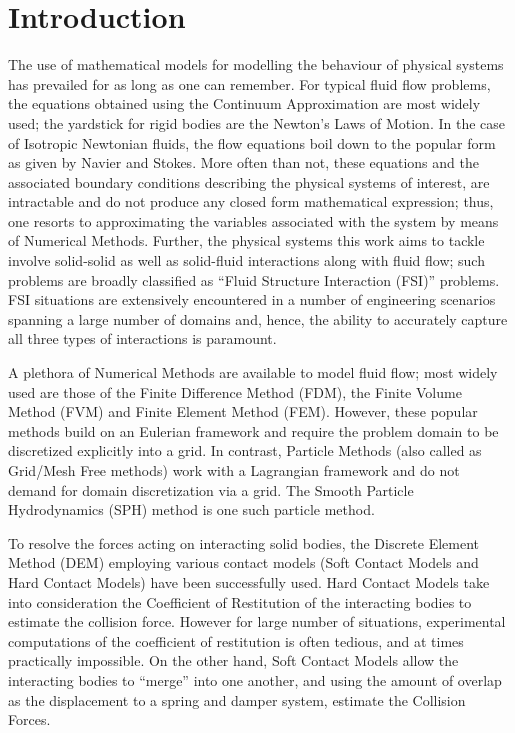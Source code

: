 \chapter{Introduction}

The use of mathematical models for modelling the behaviour of physical systems has prevailed for as long as one can remember. For typical fluid flow problems, the equations obtained using the Continuum Approximation are most widely used; the yardstick for rigid bodies are the Newton's Laws of Motion. In the case of Isotropic Newtonian fluids, the flow equations boil down to the popular form as given by Navier and Stokes. More often than not, these equations and the associated boundary conditions describing the physical systems of interest, are intractable and do not produce any closed form mathematical expression; thus, one resorts to approximating the variables associated with the system by means of Numerical Methods. Further, the physical systems this work aims to tackle involve solid-solid as well as solid-fluid interactions along with fluid flow; such problems are broadly classified as ``Fluid Structure Interaction (FSI)'' problems. FSI situations are extensively encountered in a number of engineering scenarios spanning a large number of domains and, hence, the ability to accurately capture all three types of interactions is paramount.

A plethora of Numerical Methods are available to model fluid flow; most widely used are those of the Finite Difference Method (FDM), the Finite Volume Method (FVM) and Finite Element Method (FEM). However, these popular methods build on an Eulerian framework and require the problem domain to be discretized explicitly into a grid. In contrast, Particle Methods (also called as Grid/Mesh Free methods) work with a Lagrangian framework and do not demand for domain discretization via a grid. The Smooth Particle Hydrodynamics (SPH) method is one such particle method.

To resolve the forces acting on interacting solid bodies, the Discrete Element Method (DEM) employing various contact models (Soft Contact Models and Hard Contact Models) have been successfully used. Hard Contact Models take into consideration the Coefficient of Restitution of the interacting bodies to estimate the collision force. However for large number of situations, experimental computations of the coefficient of restitution is often tedious, and at times practically impossible. On the other hand, Soft Contact Models allow the interacting bodies to ``merge'' into one another, and using the amount of overlap as the displacement to a spring and damper system, estimate the Collision Forces.

